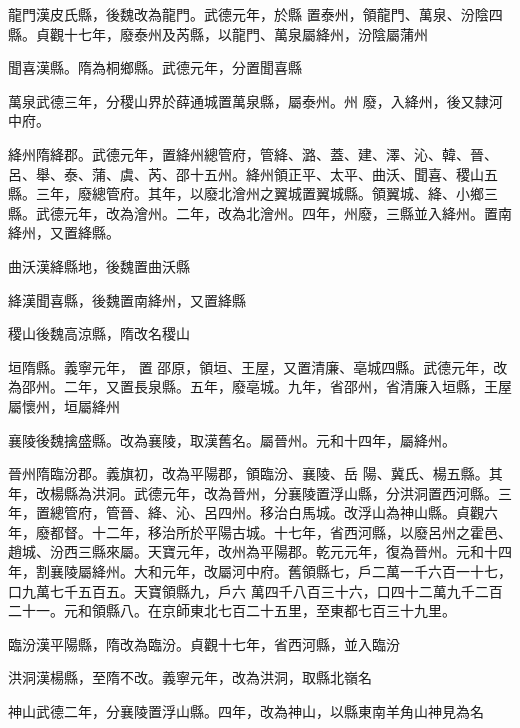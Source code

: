 \begin{pinyinscope}
 龍門漢皮氏縣，後魏改為龍門。武德元年，於縣
 置泰州，領龍門、萬泉、汾陰四縣。貞觀十七年，廢泰州及芮縣，以龍門、萬泉屬絳州，汾陰屬蒲州



 聞喜漢縣。隋為桐鄉縣。武德元年，分置聞喜縣



 萬泉武德三年，分稷山界於薛通城置萬泉縣，屬泰州。州
 廢，入絳州，後又隸河中府。



 絳州隋絳郡。武德元年，置絳州總管府，管絳、潞、蓋、建、澤、沁、韓、晉、呂、舉、泰、蒲、虞、芮、邵十五州。絳州領正平、太平、曲沃、聞喜、稷山五縣。三年，廢總管府。其年，以廢北澮州之翼城置翼城縣。領翼城、絳、小鄉三縣。武德元年，改為澮州。二年，改為北澮州。四年，州廢，三縣並入絳州。置南絳州，又置絳縣。



 曲沃漢絳縣地，後魏置曲沃縣



 絳漢聞喜縣，後魏置南絳州，又置絳縣



 稷山後魏高涼縣，隋改名稷山



 垣隋縣。義寧元年，
 置
 邵原，領垣、王屋，又置清廉、亳城四縣。武德元年，改為邵州。二年，又置長泉縣。五年，廢亳城。九年，省邵州，省清廉入垣縣，王屋屬懷州，垣屬絳州



 襄陵後魏擒盛縣。改為襄陵，取漢舊名。屬晉州。元和十四年，屬絳州。



 晉州隋臨汾郡。義旗初，改為平陽郡，領臨汾、襄陵、岳
 陽、冀氏、楊五縣。其年，改楊縣為洪洞。武德元年，改為晉州，分襄陵置浮山縣，分洪洞置西河縣。三年，置總管府，管晉、絳、沁、呂四州。移治白馬城。改浮山為神山縣。貞觀六年，廢都督。十二年，移治所於平陽古城。十七年，省西河縣，以廢呂州之霍邑、趙城、汾西三縣來屬。天寶元年，改州為平陽郡。乾元元年，復為晉州。元和十四年，割襄陵屬絳州。大和元年，改屬河中府。舊領縣七，戶二萬一千六百一十七，口九萬七千五百五。天寶領縣九，戶六
 萬四千八百三十六，口四十二萬九千二百二十一。元和領縣八。在京師東北七百二十五里，至東都七百三十九里。



 臨汾漢平陽縣，隋改為臨汾。貞觀十七年，省西河縣，並入臨汾



 洪洞漢楊縣，至隋不改。義寧元年，改為洪洞，取縣北嶺名



 神山武德二年，分襄陵置浮山縣。四年，改為神山，以縣東南羊角山神見為名




\end{pinyinscope}
